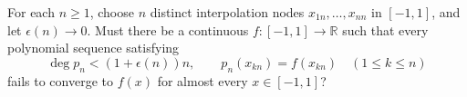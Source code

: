 For each $n\geq1$, choose $n$ distinct interpolation nodes $x_{1n},\ldots,x_{nn}$ in $[-1,1]$, and let $\epsilon(n)\to0$. Must there be a continuous $f:[-1,1]\to\mathbb R$ such that every polynomial sequence satisfying
\[
\deg p_n<(1+\epsilon(n))n,\qquad p_n(x_{kn})=f(x_{kn})\quad(1\leq k\leq n)
\]
fails to converge to $f(x)$ for almost every $x\in[-1,1]$?
